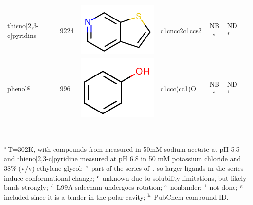 \documentclass[aps,pre,twocolumn,nofootinbib,superscriptaddress,10pt, final,tightenlines]{revtex4-1}
\begin{document}
\begin{table}
\begin{center}
\begin{tabular}{llp{2cm}>{\ttfamily}lS[table-format=-1.2, table-figures-uncertainty=1]ll}
thieno[2,3-c]pyridine            & 9224                    &  \parbox[c]{1em}{\includegraphics[scale=0.2]{figures/9224.pdf}}  & c1cncc2c1ccs2          & {NB$^{\rm e}$}                         & ND$^{\rm f}$                                                            & \cite{mobley_predicting_2007}                                \\        %
phenol$^{\rm g}$                 & 996                      &  \parbox[c]{1em}{\includegraphics[scale=0.2]{figures/996.pdf}}   & c1ccc(cc1)O            & {NB$^{\rm e}$}                         & ND$^{\rm f}$                                                            & \cite{morton_energetic_1995, mobley_predicting_2007}         \\%

\hline
\end{tabular}\\
\end{center}
$^{\rm a}$T=302K, with compounds from \cite{morton_energetic_1995} measured in 50mM sodium acetate at pH 5.5 and thieno[2,3-c]pyridine measured at pH 6.8 in 50 mM potassium chloride and 38\% (v/v) ethylene glycol; $^{\rm b}$ part of the series of~\cite{merski_homologous_2015}, so larger ligands in the series induce conformational change; $^{\rm c}$ unknown due to solubility limitations, but likely binds strongly; $^{\rm d}$ L99A sidechain undergoes rotation; $^{\rm e}$ nonbinder; $^{\rm f}$ not done; $^{\rm g}$ included since it is a binder in the polar cavity; $^{\rm h}$ PubChem compound ID.
\end{table}
\endgroup
\end{document}
